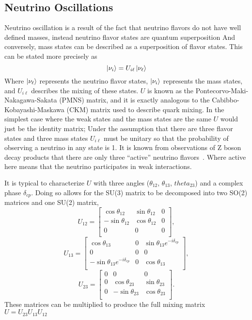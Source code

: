 \subsection{Neutrino Oscillations}
Neutrino oscillation is a result of the fact that neutrino flavors do not have
well defined masses, instead neutrino flavor states are quantum superposition
And conversely, mass states can be described as a superposition of flavor states.
This can be stated more precisely as
\begin{equation}
    \ket{\nu_{i}} = U_{i\ell}\ket{\nu_\ell}
\end{equation}
Where $\ket{\nu_\ell}$ represents the neutrino flavor states, $\ket{\nu_i}$
represents the mass states, and $U_{i\ell}$ describes the mixing of these
states. $U$ is known as the Pontecorvo-Maki-Nakagawa-Sakata (PMNS) matrix,
and it is exactly analogous to the Cabibbo-Kobayashi-Maskawa (CKM) matrix used
to describe quark mixing.
In the simplest case where the weak states and the mass states are the same
$U$ would just be the identity matrix;
Under the assumption that there are three flavor states and three mass states
$U_{i\ell}$ must be unitary so that the probability of observing
a neutrino in any state is 1.
It is known from observations of Z boson decay products that
there are only three ``active'' neutrino flavors~\cite{Zbosondecaypaper}.
Where active here means that the neutrino participates in
weak interactions.

It is typical to characterize $U$ with three angles
($\theta_{12}$, $\theta_{13}$, $theta_{23}$) and a complex
phase $\delta_{cp}$. Doing so allows for the SU(3) matrix to
be decomposed into two SO(2) matrices and one SU(2) matrix,
$$U_{12} =
\begin{bmatrix}
    \cos\theta_{12} & \sin\theta_{12} & 0  \\
    -\sin\theta_{12}& \cos\theta_{12} & 0  \\
    0 & 0 & 0  \\
\end{bmatrix},
$$
$$
U_{13} =
\begin{bmatrix}
    \cos\theta_{13} & 0 & \sin\theta_{13}e^{-i\delta_{cp}}\\
    0 & 0 & 0  \\
    -\sin\theta_{13} e^{-i\delta_{cp}} & 0 & \cos\theta_{13}  \\
\end{bmatrix},
$$
$$
U_{23} =
\begin{bmatrix}
    0 & 0 & 0  \\
    0 & \cos\theta_{23} & \sin\theta_{23} \\
    0 & -\sin\theta_{23} & \cos\theta_{23}   \\
\end{bmatrix}.
$$
These matrices can be multiplied to produce the full mixing matrix
$U = U_{23}U_{13}U_{12}$

